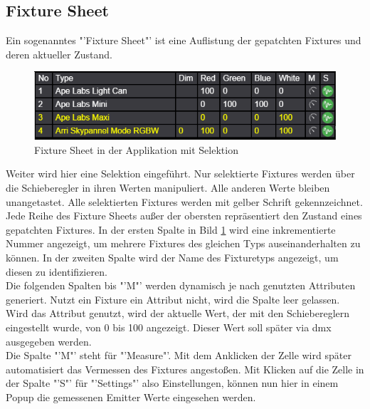 \documentclass[11pt]{scrartcl}
\begin{document}
\subsection{Fixture Sheet}
Ein sogenanntes "'Fixture Sheet"' ist eine Auflistung der gepatchten Fixtures und deren aktueller Zustand.
\begin{figure}[H]
    \begin{center}
        \includegraphics[width=.9\textwidth]{images/app_fixture_sheet_dummy.png}
    \end{center}
    \caption{Fixture Sheet in der Applikation mit Selektion}\label{fig:fixtureSheet}
\end{figure}
\noindent
Weiter wird hier eine Selektion eingeführt. Nur selektierte Fixtures werden über die Schieberegler in ihren Werten manipuliert. Alle anderen Werte bleiben
unangetastet. Alle selektierten Fixtures werden mit gelber Schrift gekennzeichnet.\\
Jede Reihe des Fixture Sheets außer der obersten repräsentiert den Zustand eines gepatchten Fixtures. In der ersten Spalte in Bild \ref{fig:fixtureSheet}
wird eine inkrementierte Nummer angezeigt, um mehrere Fixtures des gleichen Typs auseinanderhalten zu können. In der zweiten Spalte wird der Name des
Fixturetyps angezeigt, um diesen zu identifizieren.\\
Die folgenden Spalten bis "'M"' werden dynamisch je nach genutzten Attributen generiert. Nutzt ein Fixture ein Attribut nicht, wird die Spalte leer gelassen.
Wird das Attribut genutzt, wird der aktuelle Wert, der mit den Schiebereglern eingestellt wurde, von 0 bis 100 angezeigt. Dieser Wert soll später via \ac{dmx}
ausgegeben werden.\\
Die Spalte "'M"' steht für "'Measure"'. Mit dem Anklicken der Zelle wird später automatisiert das Vermessen des Fixtures angestoßen. Mit Klicken auf die
Zelle in der Spalte "'S"' für "'Settings"' also Einstellungen, können nun hier in einem Popup die gemessenen Emitter Werte eingesehen werden.
\end{document}
